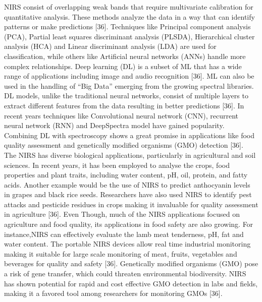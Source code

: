 \documentclass[12pt,a4paper]{report}
\begin{document}
NIRS consist of overlapping weak bands that require multivariate calibration for quantitative analysis. These methods analyze the data in a way that can identify patterns or make predictions [36]. Techniques like Principal component analysis (PCA), Partial least squares discriminant analysis (PLSDA), Hierarchical cluster analysis (HCA) and Linear discriminant analysis (LDA) are used for classification, while others like Artificial neural networks (ANNs) handle more complex relationships. 
Deep learning (DL) is a subset of ML that has a wide range of applications including image and audio recognition [36]. ML can also be used in the handling of “Big Data” emerging from the growing spectral libraries. DL models, unlike the traditional neural networks, consist of multiple layers to extract different features from the data resulting in better predictions [36]. In recent years techniques like Convolutional neural network (CNN), recurrent neural network (RNN) and DeepSpectra 
model have gained popularity. Combining DL with spectroscopy shows a great promise in applications like food quality assessment and genetically modified organisms (GMO) detection [36].\\

The NIRS has diverse biological applications, particularly in agricultural and soil sciences. In recent years, it has been employed to analyse the crops, food properties and plant traits, including water content, pH, oil, protein, and fatty acids. Another example would be the use of NIRS to predict anthocyanin levels in grapes and black rice seeds. Researchers have also used NIRS to identify pest attacks and pesticide residues in crops making it invaluable for quality assessment 
in agriculture [36]. Even Though, much of the NIRS applications focused on agriculture and food quality, its applications in food safety are also growing. For instance,NIRS can effectively evaluate the lamb meat tenderness, pH, fat and water content. The portable NIRS devices allow real time industrial monitoring making it suitable for large scale monitoring of meat, fruits, vegetables and beverages for quality and safety [36]. Genetically modified organisms (GMO) pose a risk of 
gene transfer, which could threaten environmental biodiversity. NIRS has shown potential for rapid and cost effective GMO detection in labs and fields, making it a favored tool among researchers for monitoring GMOs [36]. \\
\end{document}
